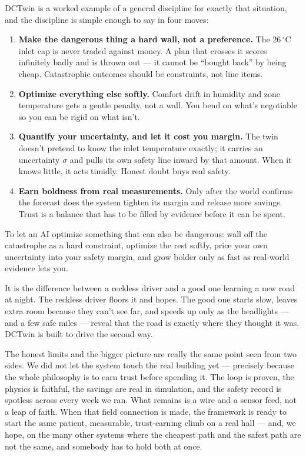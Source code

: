 \documentclass[11pt]{report}
\begin{document}
DCTwin is a worked example of a general discipline for exactly that situation, and the discipline is simple enough to say in four moves:

\begin{enumerate}
  \item \textbf{Make the dangerous thing a hard wall, not a preference.} The $26\,^\circ$C inlet cap is never traded against money. A plan that crosses it scores infinitely badly and is thrown out --- it cannot be ``bought back'' by being cheap. Catastrophic outcomes should be constraints, not line items.
  \item \textbf{Optimize everything else softly.} Comfort drift in humidity and zone temperature gets a gentle penalty, not a wall. You bend on what's negotiable so you can be rigid on what isn't.
  \item \textbf{Quantify your uncertainty, and let it cost you margin.} The twin doesn't pretend to know the inlet temperature exactly; it carries an uncertainty $\sigma$ and pulls its own safety line inward by that amount. When it knows little, it acts timidly. Honest doubt buys real safety.
  \item \textbf{Earn boldness from real measurements.} Only after the world confirms the forecast does the system tighten its margin and release more savings. Trust is a balance that has to be filled by evidence before it can be spent.
\end{enumerate}

\begin{keyidea}
To let an AI optimize something that can also be dangerous: wall off the catastrophe as a hard constraint, optimize the rest softly, price your own uncertainty into your safety margin, and grow bolder only as fast as real-world evidence lets you.
\end{keyidea}

\begin{analogy}
It is the difference between a reckless driver and a good one learning a new road at night. The reckless driver floors it and hopes. The good one starts slow, leaves extra room because they can't see far, and speeds up only as the headlights --- and a few safe miles --- reveal that the road is exactly where they thought it was. DCTwin is built to drive the second way.
\end{analogy}

The honest limits and the bigger picture are really the same point seen from two sides. We did not let the system touch the real building yet --- precisely because the whole philosophy is to earn trust before spending it. The loop is proven, the physics is faithful, the savings are real in simulation, and the safety record is spotless across every week we ran. What remains is a wire and a sensor feed, not a leap of faith. When that field connection is made, the framework is ready to start the same patient, measurable, trust-earning climb on a real hall --- and, we hope, on the many other systems where the cheapest path and the safest path are not the same, and somebody has to hold both at once.
\end{document}
